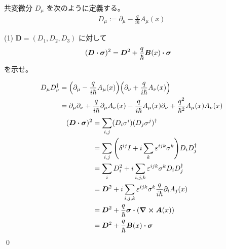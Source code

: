\documentclass[uplatex,dvipdfmx,a4paper,11pt]{jlreq}
\makeatletter
\theoremstyle{definition}
\renewenvironment{proof}[1][\proofname]{\par
  \normalfont
  \topsep6\p@\@plus6\p@ \trivlist
  \item[\hskip\labelsep{\bfseries #1}\@addpunct{\bfseries}]\ignorespaces\quad\par
}{%
  \qed\endtrivlist\@endpefalse
}
\renewcommand\proofname{証明}
\makeatother
\begin{document}
\begin{problem}
共変微分 $D_\mu$ を次のように定義する。
\begin{align}
  D_\mu := \partial_\mu - \frac{q}{i\hbar}A_\mu(x)
\end{align}
\end{problem}
(1) $\bm{D} = (D_1, D_2, D_3)$ に対して
\begin{align}
  (\bm{D}\vdot\bm{\sigma})^2 & = \bm{D}^2 + \frac{q}{\hbar}\bm{B}(x)\vdot\bm{\sigma}
\end{align}
を示せ。
\begin{proof}
  \begin{align}
    D_\mu D_\nu^\dagger & = \qty(\partial_\mu - \frac{q}{i\hbar}A_\mu(x))\qty(\partial_\nu + \frac{q}{i\hbar}A_\nu(x))                                                    \\
                        & = \partial_\mu\partial_\nu + \frac{q}{i\hbar}\partial_\mu A_\nu(x) - \frac{q}{i\hbar}A_\mu(x)\partial_\nu + \frac{q^2}{\hbar^2}A_\mu(x)A_\nu(x)
  \end{align}
  \begin{align}
    (\bm{D}\vdot\bm{\sigma})^2 & = \sum_{i,j}(D_i\sigma^i)(D_j\sigma^j)^\dagger                                      \\
                               & = \sum_{i,j}\qty(\delta^{ij}I + i\sum_{k}\varepsilon^{ijk}\sigma^k)D_iD_j^\dagger   \\
                               & = \sum_{i}D_i^2 + i\sum_{i,j,k}\varepsilon^{ijk}\sigma^kD_iD_j^\dagger              \\
                               & = \bm{D}^2 + i\sum_{i,j,k}\varepsilon^{ijk}\sigma^k\frac{q}{i\hbar}\partial_iA_j(x) \\
                               & = \bm{D}^2 + \frac{q}{\hbar}\bm{\sigma}\vdot(\vnabla\cross\bm{A}(x))                \\
                               & = \bm{D}^2 + \frac{q}{\hbar}\bm{B}(x)\vdot\bm{\sigma}
  \end{align}
\end{proof}
\end{document}
